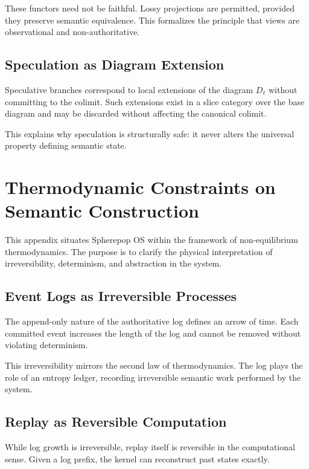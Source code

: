 \documentclass[11pt]{article}
\begin{document}
These functors need not be faithful. Lossy projections are permitted,
provided they preserve semantic equivalence. This formalizes the principle
that views are observational and non-authoritative.

\subsection{Speculation as Diagram Extension}

Speculative branches correspond to local extensions of the diagram
$D_\ell$ without committing to the colimit. Such extensions exist in a
slice category over the base diagram and may be discarded without
affecting the canonical colimit.

This explains why speculation is structurally safe: it never alters the
universal property defining semantic state.

\section{Thermodynamic Constraints on Semantic Construction}

This appendix situates Spherepop OS within the framework of
non-equilibrium thermodynamics. The purpose is to clarify the physical
interpretation of irreversibility, determinism, and abstraction in the
system.

\subsection{Event Logs as Irreversible Processes}

The append-only nature of the authoritative log defines an arrow of time.
Each committed event increases the length of the log and cannot be
removed without violating determinism.

This irreversibility mirrors the second law of thermodynamics. The log
plays the role of an entropy ledger, recording irreversible semantic work
performed by the system.

\subsection{Replay as Reversible Computation}

While log growth is irreversible, replay itself is reversible in the
computational sense. Given a log prefix, the kernel can reconstruct past
states exactly.
\end{document}

